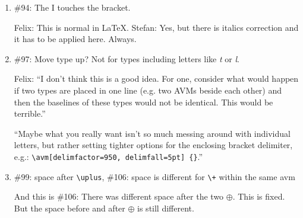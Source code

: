\documentclass[output=book
		,modfonts
		,nonflat
	        ,collection
	        ,collectionchapter
	        ,collectiontoclongg
 	        ,biblatex  
                ,babelshorthands
                ,newtxmath
                ,colorlinks, citecolor=brown 
                ,draftmode
		  ]{langscibook}
\begin{document}
\begin{enumerate}
I want both AVMs to appear at the top right below the heading. \verb+\attop+ does not work since it puts the following AVM on the next line.
\ea
\label{entryfori}
Simplified lexical signs for  \textit{I} and \textit{she}: \\*
\hspace{1cm}
\z
Felix provided solution with minipage, but could there be an option for calling \verb+\avm+? And if
so, could forest enable this by default?


\item \#94: The I touches the bracket.

\ea
{}
\z

Felix: This is normal in \LaTeX. Stefan: Yes, but there is italics correction and it has to be
applied here. Always.


\item \#97: Move type up? Not for types including letters like \emph{t} or \emph{l}.

\ea
{}
\z

Felix: ``I don't think this is a good idea. For one, consider what would happen if two types are
placed in one line (e.g. two AVMs beside each other) and then the baselines of these types would not
be identical. This would be terrible.''

``Maybe what you really want isn't so much messing around with individual letters, but rather setting tighter options for the enclosing bracket delimiter, e.g.: \verb+\avm[delimfactor=950, delimfall=5pt] {}+.''


\item \#99: space after \verb+\uplus+, \#106: space is different for \verb-\+- within the same avm


\ea
{}
\z

And this is \#106:
\ea
{}
\z
There was different space after the two $\oplus$. This is fixed. But the space before and after
$\oplus$ is still different.


\end{enumerate}
\end{document}
